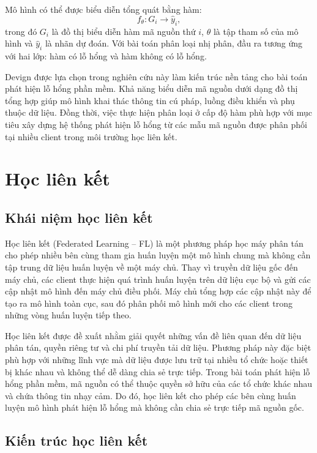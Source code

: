 Mô hình có thể được biểu diễn tổng quát bằng hàm:
\[
	f_{\theta}: G_i \rightarrow \hat{y}_i,
\]
trong đó $G_i$ là đồ thị biểu diễn hàm mã nguồn thứ $i$, $\theta$ là tập tham số của mô hình và
$\hat{y}_i$ là nhãn dự đoán. Với bài toán phân loại nhị phân, đầu ra tương ứng với hai lớp: hàm có
lỗ hổng và hàm không có lỗ hổng.

Devign được lựa chọn trong nghiên cứu này làm kiến trúc nền tảng cho bài toán phát hiện lỗ hổng
phần mềm. Khả năng biểu diễn mã nguồn dưới dạng đồ thị tổng hợp giúp mô hình khai thác thông tin cú
pháp, luồng điều khiển và phụ thuộc dữ liệu. Đồng thời, việc thực hiện phân loại ở cấp độ hàm phù
hợp với mục tiêu xây dựng hệ thống phát hiện lỗ hổng từ các mẫu mã nguồn được phân phối tại nhiều
client trong môi trường học liên kết.

\section{Học liên kết}

\subsection{Khái niệm học liên kết}

Học liên kết (Federated Learning -- FL) là một phương pháp học máy phân tán cho phép nhiều bên cùng
tham gia huấn luyện một mô hình chung mà không cần tập trung dữ liệu huấn luyện về một máy chủ.
Thay vì truyền dữ liệu gốc đến máy chủ, các client thực hiện quá trình huấn luyện trên dữ liệu cục
bộ và gửi các cập nhật mô hình đến máy chủ điều phối. Máy chủ tổng hợp các cập nhật này để tạo ra
mô hình toàn cục, sau đó phân phối mô hình mới cho các client trong những vòng huấn luyện tiếp
theo.

Học liên kết được đề xuất nhằm giải quyết những vấn đề liên quan đến dữ liệu phân tán, quyền riêng
tư và chi phí truyền tải dữ liệu. Phương pháp này đặc biệt phù hợp với những lĩnh vực mà dữ liệu
được lưu trữ tại nhiều tổ chức hoặc thiết bị khác nhau và không thể dễ dàng chia sẻ trực tiếp.
Trong bài toán phát hiện lỗ hổng phần mềm, mã nguồn có thể thuộc quyền sở hữu của các tổ chức khác
nhau và chứa thông tin nhạy cảm. Do đó, học liên kết cho phép các bên cùng huấn luyện mô hình phát
hiện lỗ hổng mà không cần chia sẻ trực tiếp mã nguồn gốc.

\subsection{Kiến trúc học liên kết}

